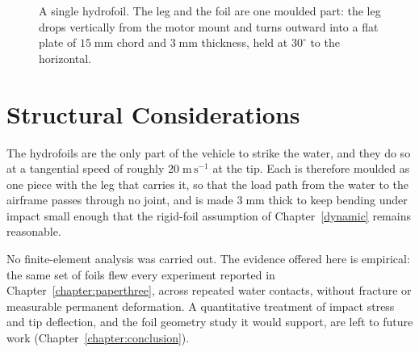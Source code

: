 \begin{figure}[t]
    \centering
    \caption{A single hydrofoil.  The leg and the foil are one moulded part:
    the leg drops vertically from the motor mount and turns outward into a
    flat plate of $15\;\mathrm{mm}$ chord and $3\;\mathrm{mm}$ thickness, held
    at $30^{\circ}$ to the horizontal.}
    \label{fig:hydrofoil_closeup}
\end{figure}

\section{Structural Considerations}

The hydrofoils are the only part of the vehicle to strike the water, and they
do so at a tangential speed of roughly $20\;\mathrm{m\,s^{-1}}$ at the tip.
Each is therefore moulded as one piece with the leg that carries it, so that
the load path from the water to the airframe passes through no joint, and is
made $3\;\mathrm{mm}$ thick to keep bending under impact small enough that the
rigid-foil assumption of Chapter~\ref{dynamic} remains reasonable.

No finite-element analysis was carried out.  The evidence offered here is
empirical: the same set of foils flew every experiment reported in
Chapter~\ref{chapter:paperthree}, across repeated water contacts, without
fracture or measurable permanent deformation.  A quantitative treatment of
impact stress and tip deflection, and the foil geometry study it would
support, are left to future work (Chapter~\ref{chapter:conclusion}).
